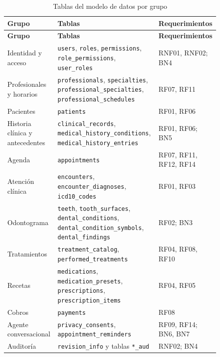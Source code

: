 \begingroup
\fontsize{9}{11}\selectfont
\renewcommand{\arraystretch}{1.2}
\setlength{\LTpre}{0pt}\setlength{\LTpost}{6pt}
\setlength{\tabcolsep}{4pt}
\begin{longtable}{|>{\raggedright\arraybackslash}p{0.22\linewidth}|>{\raggedright\arraybackslash}p{0.42\linewidth}|>{\raggedright\arraybackslash}p{0.22\linewidth}|}
\caption{Tablas del modelo de datos por grupo}
\label{tab:ob2_tablas_modulo} \\
\hline
\textbf{Grupo} & \textbf{Tablas} & \textbf{Requerimientos} \\ \hline
\endfirsthead
\hline
\textbf{Grupo} & \textbf{Tablas} & \textbf{Requerimientos} \\ \hline
\endhead
\hline
\endfoot
Identidad y acceso & \texttt{users}, \texttt{roles}, \texttt{permissions}, \texttt{role\_permissions}, \texttt{user\_roles} & RNF01, RNF02; BN4 \\ \hline
Profesionales y horarios & \texttt{professionals}, \texttt{specialties}, \texttt{professional\_specialties}, \texttt{professional\_schedules} & RF07, RF11 \\ \hline
Pacientes & \texttt{patients} & RF01, RF06 \\ \hline
Historia clínica y antecedentes & \texttt{clinical\_records}, \texttt{medical\_history\_conditions}, \texttt{medical\_history\_entries} & RF01, RF06; BN5 \\ \hline
Agenda & \texttt{appointments} & RF07, RF11, RF12, RF14 \\ \hline
Atención clínica & \texttt{encounters}, \texttt{encounter\_diagnoses}, \texttt{icd10\_codes} & RF01, RF03 \\ \hline
Odontograma & \texttt{teeth}, \texttt{tooth\_surfaces}, \texttt{dental\_conditions}, \texttt{dental\_condition\_symbols}, \texttt{dental\_findings} & RF02; BN3 \\ \hline
Tratamientos & \texttt{treatment\_catalog}, \texttt{performed\_treatments} & RF04, RF08, RF10 \\ \hline
Recetas & \texttt{medications}, \texttt{medication\_presets}, \texttt{prescriptions}, \texttt{prescription\_items} & RF04, RF05 \\ \hline
Cobros & \texttt{payments} & RF08 \\ \hline
Agente conversacional & \texttt{privacy\_consents}, \texttt{appointment\_reminders} & RF09, RF14; BN6, BN7 \\ \hline
Auditoría & \texttt{revision\_info} y tablas \texttt{*\_aud} & RNF02; BN4 \\ \hline
\end{longtable}
\endgroup
